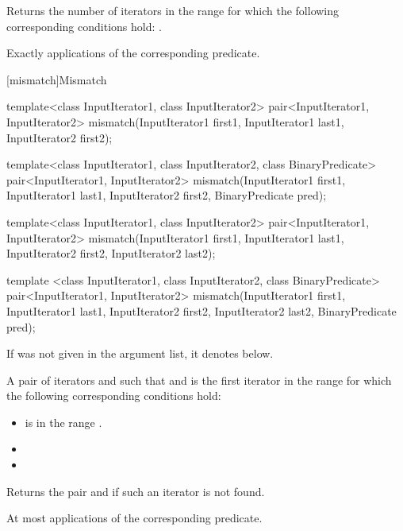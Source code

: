 \begin{itemdescr}
\pnum
\effects
Returns the number of iterators
in the range 
for which the following corresponding
conditions hold:
.

\pnum
\complexity
Exactly
applications of the corresponding predicate.
\end{itemdescr}

[mismatch]{Mismatch}

%
\begin{itemdecl}
template<class InputIterator1, class InputIterator2>
  pair<InputIterator1, InputIterator2>
      mismatch(InputIterator1 first1, InputIterator1 last1,
               InputIterator2 first2);

template<class InputIterator1, class InputIterator2,
          class BinaryPredicate>
  pair<InputIterator1, InputIterator2>
      mismatch(InputIterator1 first1, InputIterator1 last1,
               InputIterator2 first2, BinaryPredicate pred);

template<class InputIterator1, class InputIterator2>
  pair<InputIterator1, InputIterator2>
    mismatch(InputIterator1 first1, InputIterator1 last1,
             InputIterator2 first2, InputIterator2 last2);

template <class InputIterator1, class InputIterator2,
           class BinaryPredicate>
  pair<InputIterator1, InputIterator2>
    mismatch(InputIterator1 first1, InputIterator1 last1,
             InputIterator2 first2, InputIterator2 last2,
             BinaryPredicate pred);
\end{itemdecl}

\begin{itemdescr}
\pnum
\remarks If  was not given in the argument list, it denotes
 below.

\pnum
\returns
A pair of iterators
and
such that
and
is the first iterator
in the range 
for which the following corresponding conditions hold:

\begin{itemize}
\item {} is in the range \tcode{[first2, last2)}.
\item {}
\item {}
\end{itemize}

Returns the pair
and
if such an iterator
is not found.

\pnum
\complexity
At most
applications of the corresponding predicate.
\end{itemdescr}

